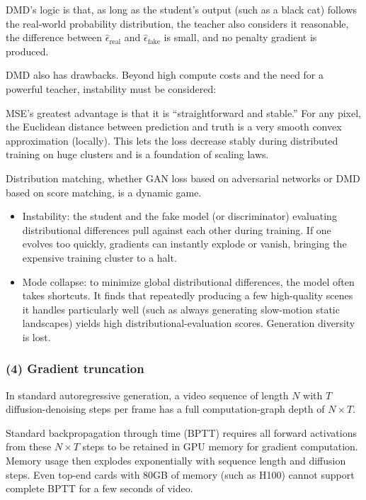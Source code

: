 DMD's logic is that, as long as the student's output (such as a black cat) follows the real-world probability distribution, the teacher also considers it reasonable, the difference between \(\hat{\epsilon}_{\mathrm{real}}\) and \(\hat{\epsilon}_{\mathrm{fake}}\) is small, and no penalty gradient is produced.

DMD also has drawbacks. Beyond high compute costs and the need for a powerful teacher, instability must be considered:

MSE's greatest advantage is that it is ``straightforward and stable.'' For any pixel, the Euclidean distance between prediction and truth is a very smooth convex approximation (locally). This lets the loss decrease stably during distributed training on huge clusters and is a foundation of scaling laws.

Distribution matching, whether GAN loss based on adversarial networks or DMD based on score matching, is a dynamic game.

\begin{itemize}
\tightlist
\item
  Instability: the student and the fake model (or discriminator) evaluating distributional differences pull against each other during training. If one evolves too quickly, gradients can instantly explode or vanish, bringing the expensive training cluster to a halt.
\item
  Mode collapse: to minimize global distributional differences, the model often takes shortcuts. It finds that repeatedly producing a few high-quality scenes it handles particularly well (such as always generating slow-motion static landscapes) yields high distributional-evaluation scores. Generation diversity is lost.
\end{itemize}

\hypertarget{gradient-truncation}{%
\subsubsection{(4) Gradient truncation}\label{gradient-truncation}}

In standard autoregressive generation, a video sequence of length \(N\) with \(T\) diffusion-denoising steps per frame has a full computation-graph depth of \(N\times T\).

Standard backpropagation through time (BPTT) requires all forward activations from these \(N\times T\) steps to be retained in GPU memory for gradient computation. Memory usage then explodes exponentially with sequence length and diffusion steps. Even top-end cards with 80GB of memory (such as H100) cannot support complete BPTT for a few seconds of video.

